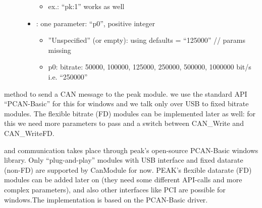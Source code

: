 \documentclass[letterpaper,10pt,english]{sphinxmanual}
\begin{document}
\begin{fulllineitems}
\begin{fulllineitems}
\begin{description}
\begin{itemize}
\begin{itemize}
\item {} 
ex.: “pk:1” works as well

\end{itemize}


\item {} 
: one parameter: “p0”, positive integer\begin{itemize}
\item {} 
”Unspecified” (or empty): using defaults = “125000” // params missing

\item {} 
p0: bitrate: 50000, 100000, 125000, 250000, 500000, 1000000 bit/s i.e. “250000”

\end{itemize}


\end{itemize}

\end{description}


\end{fulllineitems}


\begin{fulllineitems}
\label{\detokenize{vendors/peak:_CPPv4N9PKCanScan11sendMessageEshPhb}}%
\pysigstartmultiline
{}\label{\detokenize{vendors/peak:classPKCanScan_1a48a2e9ba00dae1b1fe01f7b095430503}}%
\pysigstopmultiline
method to send a CAN message to the peak module. we use the standard API “PCAN-Basic” for this for windows and we talk only over USB to fixed bitrate modules. The flexible bitrate (FD) modules can be implemented later as well: for this we need more parameters to pass and a switch between CAN\_Write and CAN\_WriteFD. 

\end{fulllineitems}


\end{fulllineitems}


and communication takes place through peak’s open-source PCAN-Basic windows library. Only “plug-and-play”
modules with USB interface and fixed datarate (non-FD) are supported by CanModule for now. PEAK’s flexible datarate (FD)
modules can be added later on (they need some different API-calls and more complex parameters), and also
other interfaces like PCI are possible for windows.The implementation is based on the PCAN-Basic driver.
\end{document}
